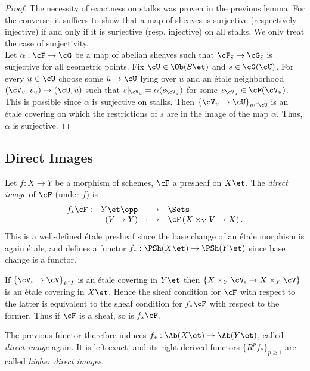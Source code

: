 \begin{proof}
The necessity of exactness on stalks was proven in the previous lemma. For the converse, it suffices to show that a map of sheaves is surjective (respectively injective) if and only if it is surjective (resp. injective) on all stalks.  We only treat the case of surjectivity.
\\
Let $\alpha : \cF \to \cG$ be a map of abelian sheaves such that $\cF_{\bar s} \to \cG_{\bar s}$ is surjective for all geometric points.  Fix $\cU\in \Ob(S\et)$ and $s \in \cG(\cU)$. For every $u\in \cU$ choose some $\bar u\to \cU$ lying over $u$ and an \'etale neighborhood $(\cV_u , \bar v_u)\to (\cU, \bar u)$ such that $s|_{\cV_u}=\alpha(s_{\cV_{u}})$ for some $s_{\cV_u}\in \cF(\cV_u)$. This is possible since $\alpha$ is surjective on stalks. Then $\left\{\cV_u\to \cU\right\}_{u\in \cU}$ is an \'etale covering on which the restrictions of $s$ are in the image of the map $\alpha$.  Thus, $\alpha$ is surjective.
\end{proof}

\subsection{Direct Images}

\begin{defi}
Let $f: X\to Y$ be a morphism of schemes, $\cF $ a presheaf on $X\et$. The \emph{direct image} of $\cF$ (under $f$) is 
$$
\begin{array}{rrcl}
f_*\cF : &Y\et\opp & \longrightarrow & \Sets \\
& \left(V\to Y\right) & \longmapsto & \cF\left(X\times_Y V\to X\right).
\end{array}
$$
This is a well-defined \'etale presheaf since the base change of an \'etale morphism is again \'etale, and defines a functor $f_* : \PSh(X\et) \to \PSh(Y\et)$ since base change is a functor. 
\end{defi}

\begin{remark}
If $\left\{\cV_i\to \cV\right\}_{i\in I}$ is an \'etale covering in $Y\et$ then $\left\{X\times_Y \cV_i\to X\times_Y \cV\right\}$ is an \'etale covering in $X\et$. Hence the sheaf condition for $\cF$ with respect to the latter is equivalent to the sheaf condition for $f_*\cF$ with respect to the former. Thus if $\cF$ is a sheaf, so is $ f_*\cF$. 
\end{remark}

\begin{defi}
The previous functor therefore induces $f_*:\Ab(X\et)\to \Ab(Y\et)$, called \emph{direct image} again. It is left exact, and its right derived functors $\{R^pf_*\}_{p \geqslant 1}$ are called \emph{higher direct images}.  
\end{defi}
	
